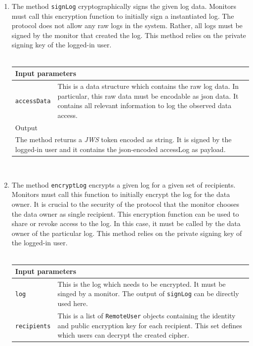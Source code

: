 \documentclass[../main.tex]{subfiles}
\begin{document}
\begin{enumerate}
    \item
    The method \verb|signLog| cryptographically signs the given log data.
    Monitors must call this encryption function to initially sign a instantiated log.
    The protocol does not allow any raw logs in the system.
    Rather, all logs must be signed by the monitor that created the log. 
    This method relies on the private signing key of the logged-in user.\\\\
    \begin{tabular}{p{3cm}p{9cm}}
        \hline
        \multicolumn{2}{l}{Input parameters}    \\ \hline
        \verb|accessData|              & This is a data structure which contains the raw log data. In particular, this raw data must be encodable as json data. It contains all relevant information to log the observed data access.           \\ \hline
        \multicolumn{2}{l}{Output}   \\ \hline
        \multicolumn{2}{p{12cm}}{The method returns a \textit{JWS} token encoded as string. It is signed by the logged-in user and it contains the json-encoded accessLog as payload.}
    \end{tabular} \\
    \item
    The method \verb|encryptLog| encrypts a given log for a given set of recipients.
    Monitors must call this function to initially encrypt the log for the data owner.
    It is crucial to the security of the protocol that the monitor chooses the data owner as single recipient. 
    This encryption function can be used to share or revoke access to the log.
    In this case, it must be called by the data owner of the particular log. 
    This method relies on the private signing key of the logged-in user.\\\\
    \begin{tabular}{p{3cm}p{9cm}}
        \hline
        \multicolumn{2}{l}{Input parameters}    \\ \hline
        \verb|log|              & This is the log which needs to be encrypted. It must be singed by a monitor. The output of \verb|signLog| can be directly used here.           \\
        \verb|recipients|       & This is a list of \verb|RemoteUser| objects containing the identity and public encryption key for each recipient. This set defines which users can decrypt the created cipher.           \\ \hline

\end{tabular}
\end{enumerate}
\end{document}
